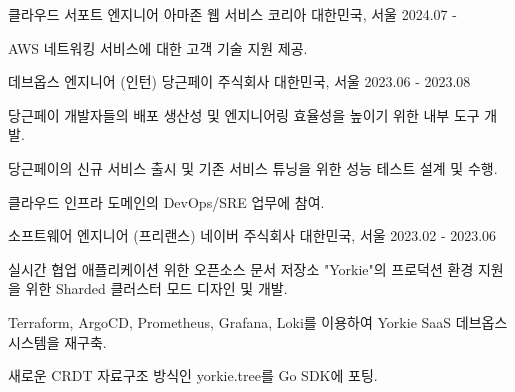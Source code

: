 

\begin{cventries}

\cventry
{클라우드 서포트 엔지니어} %
{아마존 웹 서비스 코리아} %
{대한민국, 서울} %
{2024.07 - } %
{
  \begin{cvitems} %
    \item {AWS 네트워킹 서비스에 대한 고객 기술 지원 제공.}
  \end{cvitems}
}

  \cventry
    {데브옵스 엔지니어 (인턴)} %
    {당근페이 주식회사} %
    {대한민국, 서울} %
    {2023.06 - 2023.08} %
    {
      \begin{cvitems} %
        \item {당근페이 개발자들의 배포 생산성 및 엔지니어링 효율성을 높이기 위한 내부 도구 개발.}
        \item {당근페이의 신규 서비스 출시 및 기존 서비스 튜닝을 위한 성능 테스트 설계 및 수행.}
        \item {클라우드 인프라 도메인의 DevOps/SRE 업무에 참여.}
      \end{cvitems}
    }

  \cventry
    {소프트웨어 엔지니어 (프리랜스)} %
    {네이버 주식회사} %
    {대한민국, 서울} %
    {2023.02 - 2023.06} %
    {
      \begin{cvitems} %
        \item {실시간 협업 애플리케이션 위한 오픈소스 문서 저장소 "Yorkie"의 프로덕션 환경 지원을 위한 Sharded 클러스터 모드 디자인 및 개발.}
        \item {Terraform, ArgoCD, Prometheus, Grafana, Loki를 이용하여 Yorkie SaaS 데브옵스 시스템을 재구축.}
        \item {새로운 CRDT 자료구조 방식인 yorkie.tree를 Go SDK에 포팅.}  
      \end{cvitems}
    }


\end{cventries}
